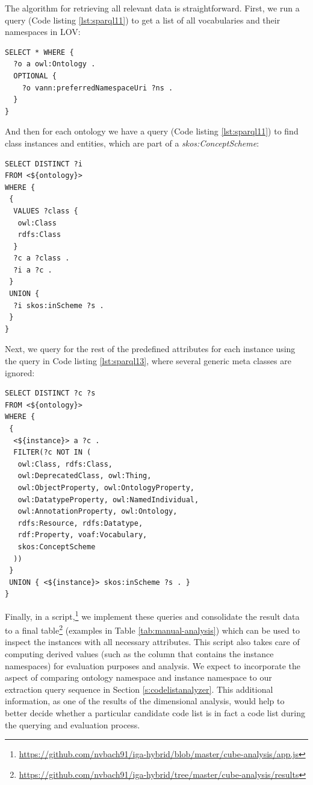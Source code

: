 The algorithm for retrieving all relevant data is straightforward. First, we run a query (Code listing \ref{lst:sparql11}) to get a list of all vocabularies and their namespaces in LOV:

\begin{lstlisting}[captionpos=b, caption=Query to retrieve all ontologies and their namespaces,label=lst:sparql11,basicstyle=\ttfamily,frame=single]
SELECT * WHERE {
  ?o a owl:Ontology .
  OPTIONAL { 
    ?o vann:preferredNamespaceUri ?ns . 
  }
}
\end{lstlisting}

And then for each ontology we have a query (Code listing \ref{lst:sparql11}) to find class instances and entities, which are part of a \textit{skos:ConceptScheme}:

\begin{lstlisting}[captionpos=b, caption=Query to retrieve all class instances and skos:ConceptScheme members,label=lst:sparql12,basicstyle=\ttfamily,frame=single]
SELECT DISTINCT ?i
FROM <${ontology}>
WHERE {
 {
  VALUES ?class {
   owl:Class
   rdfs:Class
  }
  ?c a ?class .
  ?i a ?c .
 }
 UNION {
  ?i skos:inScheme ?s .
 }
}
\end{lstlisting}

Next, we query for the rest of the predefined attributes for each instance using the query in Code listing \ref{lst:sparql13}, where several generic meta classes are ignored:

\begin{lstlisting}[captionpos=b, caption=Query to retrieve all class instances and skos:ConceptScheme members,label=lst:sparql13,basicstyle=\ttfamily,frame=single]
SELECT DISTINCT ?c ?s
FROM <${ontology}>
WHERE {
 {
  <${instance}> a ?c .
  FILTER(?c NOT IN (
   owl:Class, rdfs:Class,
   owl:DeprecatedClass, owl:Thing, 
   owl:ObjectProperty, owl:OntologyProperty,
   owl:DatatypeProperty, owl:NamedIndividual,
   owl:AnnotationProperty, owl:Ontology,
   rdfs:Resource, rdfs:Datatype,
   rdf:Property, voaf:Vocabulary, 
   skos:ConceptScheme
  ))
 }
 UNION { <${instance}> skos:inScheme ?s . }
}
\end{lstlisting}

Finally, in a script,\footnote{\label{note:customScript}\url{https://github.com/nvbach91/iga-hybrid/blob/master/cube-analysis/app.js}} we implement these queries and consolidate the result data to a final table\footnote{\url{https://github.com/nvbach91/iga-hybrid/tree/master/cube-analysis/results}} (examples in Table \ref{tab:manual-analysis}) which can be used to inspect the instances with all necessary attributes. This script also takes care of computing derived values (such as the column that contains the instance namespaces) for evaluation purposes and analysis. We expect to incorporate the aspect of comparing ontology namespace and instance namespace to our extraction query sequence in Section \ref{s:codelistanalyzer}. This additional information, as one of the results of the dimensional analysis, would help to better decide whether a particular candidate code list is in fact a code list during the querying and evaluation process.


